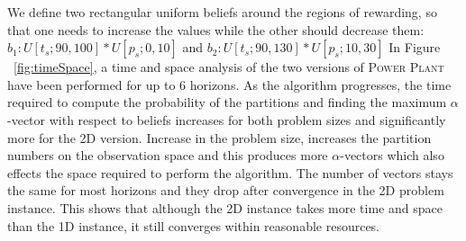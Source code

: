 \documentclass{article} %
\begin{document}
We define two rectangular uniform beliefs around the regions of rewarding, so that one needs to increase the values while the other should decrease them: $b_1: U[t_s;90,100]*U[p_s;0,10]$ and $b_2: U[t_s;90,130]*U[p_s;10,30]$
In Figure ~\ref{fig:timeSpace}, a time and space analysis of
the two versions of \textsc{Power Plant} have been performed for up to 6 horizons. %
As the algorithm progresses, the time required to compute the probability of the partitions and finding the maximum $\alpha$-vector with respect to beliefs increases for both problem sizes and significantly more for the 2D version. %
Increase in the problem size, increases the partition numbers on the observation space and this produces more $\alpha$-vectors which also effects the space required to perform the algorithm. The number of vectors stays the same for most horizons and they drop after convergence in the 2D problem instance. %
This shows that although the 2D instance takes more time and space than the 1D instance, it still converges within reasonable resources.
\end{document}

